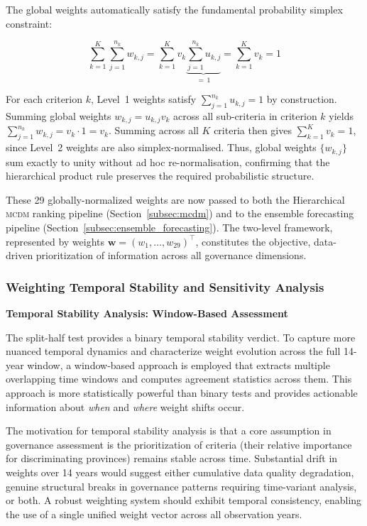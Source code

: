 \documentclass[12pt,a4paper]{article}
\newcommand{\MCDM}{\textsc{mcdm}\xspace}
\begin{document}
The global weights automatically satisfy the fundamental probability simplex constraint:

\begin{equation}
\label{eq:simplex_proof}
\sum_{k=1}^{K} \sum_{j=1}^{n_k} w_{k,j}
= \sum_{k=1}^{K} v_k \underbrace{\sum_{j=1}^{n_k} u_{k,j}}_{=\,1}
= \sum_{k=1}^{K} v_k = 1
\end{equation}

For each criterion $k$, Level~1 weights satisfy $\sum_{j=1}^{n_k} u_{k,j} = 1$ by construction. Summing global weights $w_{k,j} = u_{k,j} v_k$ across all sub-criteria in criterion $k$ yields $\sum_{j=1}^{n_k} w_{k,j} = v_k \cdot 1 = v_k$. Summing across all $K$ criteria then gives $\sum_{k=1}^{K} v_k = 1$, since Level~2 weights are also simplex-normalised. Thus, global weights $\{w_{k,j}\}$ sum exactly to unity without ad hoc re-normalisation, confirming that the hierarchical product rule preserves the required probabilistic structure.

These 29 globally-normalized weights are now passed to both the Hierarchical \MCDM ranking pipeline (Section~\ref{subsec:mcdm}) and to the ensemble forecasting pipeline (Section~\ref{subsec:ensemble_forecasting}). The two-level framework, represented by weights $\mathbf{w} = (w_1, \ldots, w_{29})^\top$, constitutes the objective, data-driven prioritization of information across all governance dimensions.

\subsubsection{Weighting Temporal Stability and Sensitivity Analysis}

\textbf{Temporal Stability Analysis: Window-Based Assessment}

The split-half test provides a binary temporal stability verdict. To capture more nuanced temporal dynamics and characterize weight evolution across the full 14-year window, a window-based approach is employed that extracts multiple overlapping time windows and computes agreement statistics across them. This approach is more statistically powerful than binary tests and provides actionable information about \textit{when} and \textit{where} weight shifts occur.

The motivation for temporal stability analysis is that a core assumption in governance assessment is the prioritization of criteria (their relative importance for discriminating provinces) remains stable across time. Substantial drift in weights over 14 years would suggest either cumulative data quality degradation, genuine structural breaks in governance patterns requiring time-variant analysis, or both. A robust weighting system should exhibit temporal consistency, enabling the use of a single unified weight vector across all observation years.
\end{document}
